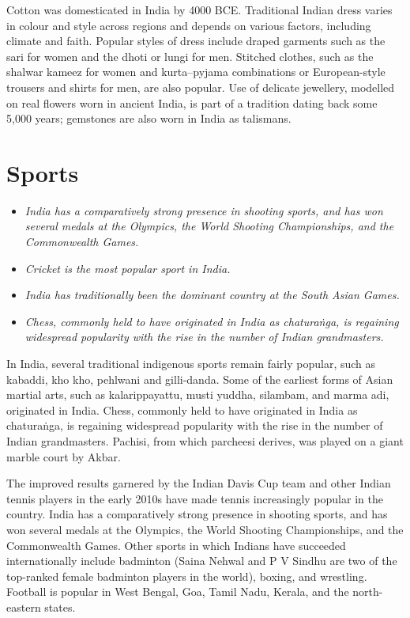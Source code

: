 Cotton was domesticated in India by 4000 BCE. Traditional Indian dress
varies in colour and style across regions and depends on various
factors, including climate and faith. Popular styles of dress include
draped garments such as the sari for women and the dhoti or lungi for
men. Stitched clothes, such as the shalwar kameez for women and
kurta--pyjama combinations or European-style trousers and shirts for
men, are also popular. Use of delicate jewellery, modelled on real
flowers worn in ancient India, is part of a tradition dating back some
5,000 years; gemstones are also worn in India as talismans.

\section{Sports}\label{sports}

\begin{itemize}
\item
  \emph{India has a comparatively strong presence in shooting sports,
  and has won several medals at the Olympics, the World Shooting
  Championships, and the Commonwealth Games.}
\item
  \emph{Cricket is the most popular sport in India.}
\item
  \emph{India has traditionally been the dominant country at the South
  Asian Games.}
\item
  \emph{Chess, commonly held to have originated in India as chaturaṅga,
  is regaining widespread popularity with the rise in the number of
  Indian grandmasters.}
\end{itemize}

In India, several traditional indigenous sports remain fairly popular,
such as kabaddi, kho kho, pehlwani and gilli-danda. Some of the earliest
forms of Asian martial arts, such as kalarippayattu, musti yuddha,
silambam, and marma adi, originated in India. Chess, commonly held to
have originated in India as chaturaṅga, is regaining widespread
popularity with the rise in the number of Indian grandmasters. Pachisi,
from which parcheesi derives, was played on a giant marble court by
Akbar.

The improved results garnered by the Indian Davis Cup team and other
Indian tennis players in the early 2010s have made tennis increasingly
popular in the country. India has a comparatively strong presence in
shooting sports, and has won several medals at the Olympics, the World
Shooting Championships, and the Commonwealth Games. Other sports in
which Indians have succeeded internationally include badminton (Saina
Nehwal and P V Sindhu are two of the top-ranked female badminton players
in the world), boxing, and wrestling. Football is popular in West
Bengal, Goa, Tamil Nadu, Kerala, and the north-eastern states.

